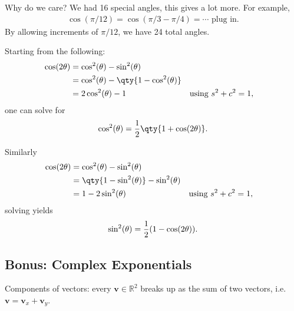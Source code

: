 \begin{remark}

Why do we care? We had 16 special angles, this gives a lot more. For
example,
\begin{align*}
\cos(\pi/12)
=
\cos(\pi/3 - \pi/4) = \cdots \text{ plug in}
.\end{align*}
By allowing increments of \(\pi/12\), we have 24 total angles.

\end{remark}

\begin{corollary}[?]

Starting from the following:
\begin{align*}
\cos(2\theta) 
&= \cos^2(\theta) - \sin^2(\theta) \\
&= \cos^2(\theta) - \qty{1 - \cos^2(\theta) } \\
&= 2\cos^2(\theta) -1 && \text{using } s^2 + c^2 = 1
,\end{align*}
one can solve for
\begin{align*}
\cos^2(\theta) = {1\over 2}\qty{1 + \cos(2\theta) }
.\end{align*}

Similarly
\begin{align*}
\cos(2\theta) 
&= \cos^2(\theta) - \sin^2(\theta) \\
&= \qty{1 - \sin^2(\theta) } - \sin^2(\theta) \\
&= 1-2\sin^2(\theta) && \text{using } s^2 + c^2 = 1
,\end{align*}
solving yields
\begin{align*}
\sin^2(\theta) = {1\over 2} (1 - \cos(2\theta) )
.\end{align*}

\end{corollary}

\hypertarget{bonus-complex-exponentials}{%
\subsection{Bonus: Complex
Exponentials}\label{bonus-complex-exponentials}}

\begin{remark}

Components of vectors: every \(\mathbf{v}\in {\mathbb{R}}^2\) breaks up
as the sum of two vectors,
i.e.~\(\mathbf{v} = \mathbf{v}_x + \mathbf{v}_y\).

\end{remark}

